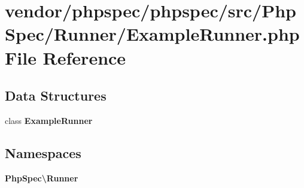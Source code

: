 \section{vendor/phpspec/phpspec/src/\+Php\+Spec/\+Runner/\+Example\+Runner.php File Reference}
\label{_example_runner_8php}
\subsection*{Data Structures}
\begin{DoxyCompactItemize}
\item 
class {\bf Example\+Runner}
\end{DoxyCompactItemize}
\subsection*{Namespaces}
\begin{DoxyCompactItemize}
\item 
 {\bf Php\+Spec\textbackslash{}\+Runner}
\end{DoxyCompactItemize}
